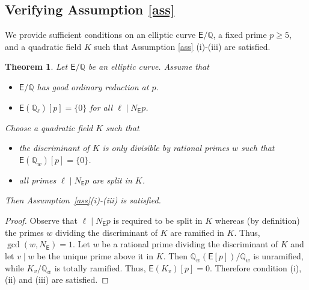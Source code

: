 \documentclass{amsart}
\newtheorem{theorem}{Theorem}[section]
\numberwithin{equation}{section}
\theoremstyle{remark}
\newcommand{\Q}{\mathbb{Q}}
\newcommand{\EC}{\mathsf{E}}
\theoremstyle{plain} %
\begin{document}
\subsection{Verifying Assumption \ref{ass}}
We provide sufficient conditions on an elliptic curve $\EC/\Q$, a fixed prime $p\geq 5$, and a quadratic field $K$ such that Assumption \ref{ass} (i)-(iii) are satisfied.


\begin{theorem}
\label{thm 4.11}
Let $\EC/\Q$ be an elliptic curve.
Assume that 
    \begin{itemize}
        \item $\EC/\Q$ has good ordinary reduction at $p$.
        \item $\EC(\Q_\ell)[p]= \{0\}$ for all $\ell\mid N_{\EC}p$.
    \end{itemize}
    Choose a quadratic field $K$ such that
\begin{itemize}
\item the discriminant of $K$ is only divisible by rational primes $w$ such that $\EC(\Q_w)[p]=\{0\}$.
\item all primes $\ell \mid N_{\EC}p$ are split in $K$.
\end{itemize}
Then Assumption~\ref{ass}\textup{(}i\textup{)}-\textup{(}iii\textup{)} is satisfied.
\end{theorem}

\begin{proof}
Observe that $\ell\mid N_{\EC}p$ is required to be split in $K$ whereas (by definition) the primes $w$ dividing the discriminant of $K$ are ramified in $K$.
Thus, $\gcd(w, N_{\EC})=1$.
Let $w$ be a rational prime dividing the discriminant of $K$ and let $v\mid w$ be the unique prime above it in $K$.
Then $\Q_w(\EC[p])/\Q_w$ is unramified, while $K_v/\Q_w$ is totally ramified.
Thus, $\EC(K_v)[p]=0$.
Therefore condition (i), (ii) and (iii) are satisfied.
\end{proof}
\end{document}
